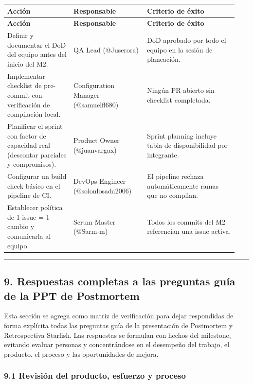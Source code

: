 \documentclass[11pt,a4paper]{article}
\begin{document}
\begingroup
\scriptsize
\setlength{\tabcolsep}{3pt}
\begin{longtable}{P{0.27\linewidth}P{0.30\linewidth}P{0.37\linewidth}}
\toprule
\textbf{Acción} & \textbf{Responsable} & \textbf{Criterio de éxito} \\
\midrule
\endfirsthead
\toprule
\textbf{Acción} & \textbf{Responsable} & \textbf{Criterio de éxito} \\
\midrule
\endhead
\bottomrule
\endlastfoot
Definir y documentar el DoD del equipo antes del inicio del M2. & QA Lead (@Juserora) & DoD aprobado por todo el equipo en la sesión de planeación. \\
Implementar checklist de pre-commit con verificación de compilación local. & Configuration Manager (@samuelfl680) & Ningún PR abierto sin checklist completada. \\
Planificar el sprint con factor de capacidad real (descontar parciales y compromisos). & Product Owner (@juanvargax) & Sprint planning incluye tabla de disponibilidad por integrante. \\
Configurar un build check básico en el pipeline de CI. & DevOps Engineer (@solonlosada2006) & El pipeline rechaza automáticamente ramas que no compilan. \\
Establecer política de 1 issue = 1 cambio y comunicarla al equipo. & Scrum Master (@Sarm-m) & Todos los commits del M2 referencian una issue activa. \\
\end{longtable}
\endgroup

\vspace{0.6em}\hrule\vspace{0.8em}

\subsection{9. Respuestas completas a las preguntas guía de la PPT de Postmortem}

Esta sección se agrega como matriz de verificación para dejar respondidas de forma explícita todas las preguntas guía de la presentación de Postmortem y Retrospectiva Starfish. Las respuestas se formulan con hechos del milestone, evitando evaluar personas y concentrándose en el desempeño del trabajo, el producto, el proceso y las oportunidades de mejora.

\subsubsection{9.1 Revisión del producto, esfuerzo y proceso}
\end{document}
